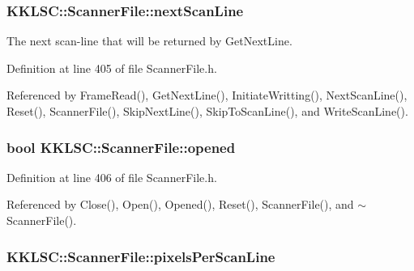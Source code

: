\subsubsection[{\texorpdfstring{next\+Scan\+Line}{nextScanLine}}]{ K\+K\+L\+S\+C\+::\+Scanner\+File\+::next\+Scan\+Line\hspace{0.3cm}{\ttfamily [protected]}}\hypertarget{class_k_k_l_s_c_1_1_scanner_file_a8175e689d6539881903c75244ae1b73e}{}\label{class_k_k_l_s_c_1_1_scanner_file_a8175e689d6539881903c75244ae1b73e}
The next scan-\/line that will be returned by \textquotesingle{}Get\+Next\+Line\textquotesingle{}. 

Definition at line 405 of file Scanner\+File.\+h.



Referenced by Frame\+Read(), Get\+Next\+Line(), Initiate\+Writting(), Next\+Scan\+Line(), Reset(), Scanner\+File(), Skip\+Next\+Line(), Skip\+To\+Scan\+Line(), and Write\+Scan\+Line().

\subsubsection[{\texorpdfstring{opened}{opened}}]{\setlength{\rightskip}{0pt plus 5cm}bool K\+K\+L\+S\+C\+::\+Scanner\+File\+::opened\hspace{0.3cm}{\ttfamily [protected]}}\hypertarget{class_k_k_l_s_c_1_1_scanner_file_a74096c23c868e43e410ceddc327e704e}{}\label{class_k_k_l_s_c_1_1_scanner_file_a74096c23c868e43e410ceddc327e704e}


Definition at line 406 of file Scanner\+File.\+h.



Referenced by Close(), Open(), Opened(), Reset(), Scanner\+File(), and $\sim$\+Scanner\+File().

\subsubsection[{\texorpdfstring{pixels\+Per\+Scan\+Line}{pixelsPerScanLine}}]{ K\+K\+L\+S\+C\+::\+Scanner\+File\+::pixels\+Per\+Scan\+Line\hspace{0.3cm}{\ttfamily [protected]}}\hypertarget{class_k_k_l_s_c_1_1_scanner_file_a07b4ac6b33c35ad0148c7a1422c73cfe}{}\label{class_k_k_l_s_c_1_1_scanner_file_a07b4ac6b33c35ad0148c7a1422c73cfe}


